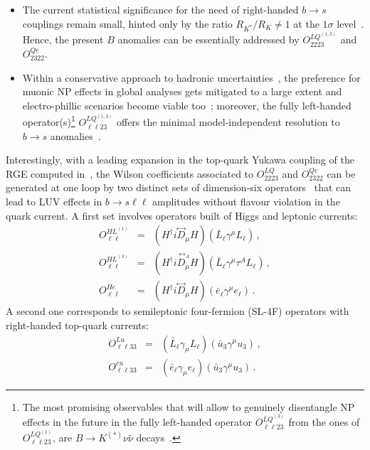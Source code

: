 \begin{itemize}
	\item The current statistical significance for the need of right-handed $b \to s$ couplings remain small, hinted only by the ratio $R_{K^{*}}/R_{K} \neq 1$ at the $1\sigma$ level~\cite{Hiller:2017bzc,Ciuchini:2019usw}. Hence, the present $B$ anomalies can be essentially addressed by $O^{LQ^{(1,3)}}_{22 23}$ and $O^{Qe}_{23 22}$.
	\item Within a conservative approach to hadronic uncertainties~\cite{Jager:2014rwa,Ciuchini:2015qxb,Arbey:2018ics}, the preference for muonic NP effects in global analyses gets mitigated to a large extent and electro-phillic scenarios become viable too~\cite{Ciuchini:2017mik}; moreover, the fully left-handed operator(s)\footnote{The most promising observables that will allow  to genuinely disentangle NP effects in the future in the fully left-handed operator $O^{LQ^{(3)}}_{\ell \ell 23}$ from the ones of $O^{LQ^{(1)}}_{\ell \ell 23}$, are $B \to K^{(*)} \nu \bar{\nu}$ decays~\cite{Altmannshofer:2009ma,Buras:2014fpa,Descotes-Genon:2020buf}.} $O^{LQ^{(1,3)}}_{\ell \ell 23}$ offers the minimal model-independent resolution to $b \to s$ anomalies~\cite{Ciuchini:2019usw}.
\end{itemize}

Interestingly, with a leading expansion in the top-quark Yukawa coupling of the RGE computed in~\cite{Jenkins:2013zja,Jenkins:2013wua}, the Wilson coefficients associated to $O^{LQ}_{22 23}$ and $O^{Qe}_{23 22}$ can be generated at one loop by two distinct sets of dimension-six operators~\cite{Celis:2017doq} that can lead to LUV effects in $b \to s \ell \ell$ amplitudes without flavour violation in the quark current. A first set involves operators built of Higgs and leptonic currents:
\begin{eqnarray} 
	\label{eq:SMEFT_op_HL}
	O^{HL^{(1)}}_{\ell \ell} &=& ( H^{\dagger} i \overset{\leftrightarrow}{D}_{\mu}H ) (\bar{L}_{\ell} \gamma^{\mu}  L_{\ell} )\,, \nonumber \\
	O^{HL^{(3)}}_{\ell \ell} &=& ( H^{\dagger} i \overset{\, \leftrightarrow_A}{D_{\mu}}H ) (\bar{L}_{\ell} \gamma^{\mu} \tau^{A} L_{\ell} )\,, \nonumber \\
	O^{He}_{\ell \ell} &=& ( H^{\dagger} i \overset{\leftrightarrow}{D}_{\mu}H ) (\bar{e}_{\ell} \gamma^{\mu}  e_{\ell} )\,.
\end{eqnarray}
A second one corresponds to semileptonic four-fermion (SL-4F) operators with right-handed top-quark currents:
\begin{eqnarray} 
	\label{eq:SMEFT_op_loop_lu}
	O^{Lu}_{\ell \ell 3 3} &=& (\bar{L}_{\ell} \gamma_\mu L_{\ell})(\bar{u}_{3}\gamma^\mu u_{3})\,, \nonumber \\
	O^{eu}_{\ell \ell 3 3} &=& (\bar{e}_{\ell} \gamma_\mu e_{\ell})(\bar{u}_{3}\gamma^\mu u_{3})\,.
\end{eqnarray}

